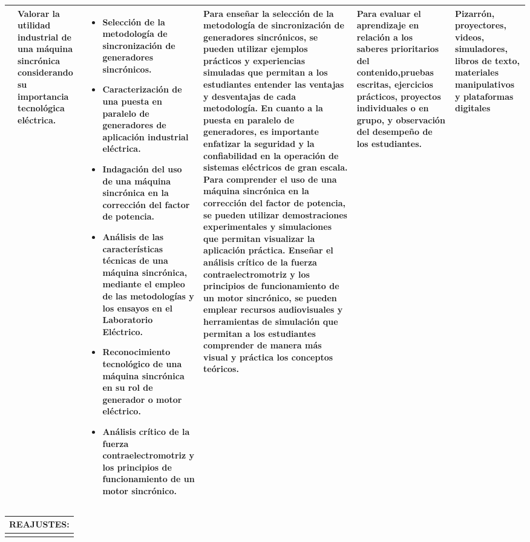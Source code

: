 \documentclass[a4paper,12pt]{article}
\newcommand{\evaluacion}{Para evaluar el aprendizaje en relación a los saberes prioritarios del contenido,pruebas escritas, ejercicios prácticos, proyectos individuales o en
grupo, y observación del desempeño de los estudiantes.}
\newcommand{\recursos}{Pizarrón, proyectores, videos, simuladores, libros de texto, materiales manipulativos y plataformas digitales}
\begin{document}
\begin{longtable}[h!]{|p{1cm}|p{3cm}|p{8cm}|p{6cm}|p{3.5cm}|p{3cm}|}
 & Valorar la utilidad industrial
de una máquina sincrónica
considerando su
importancia tecnológica
eléctrica. & \begin{itemize}
    \item Selección de la metodología de sincronización de
generadores sincrónicos.
\item Caracterización de una puesta en paralelo de
generadores de aplicación industrial eléctrica.
\item Indagación del uso de una máquina sincrónica en la
corrección del factor de potencia.
\item Análisis de las características técnicas de una máquina
sincrónica, mediante el empleo de las metodologías y los
ensayos en el Laboratorio Eléctrico.
\item Reconocimiento tecnológico de una máquina sincrónica
en su rol de generador o motor eléctrico.
\item Análisis crítico de la fuerza contraelectromotriz y los
principios de funcionamiento de un motor sincrónico. 
\end{itemize}& Para enseñar la selección de la metodología de sincronización de generadores sincrónicos, se pueden utilizar ejemplos prácticos y experiencias simuladas que permitan a los estudiantes entender las ventajas y desventajas de cada metodología. En cuanto a la puesta en paralelo de generadores, es importante enfatizar la seguridad y la confiabilidad en la operación de sistemas eléctricos de gran escala. Para comprender el uso de una máquina sincrónica en la corrección del factor de potencia, se pueden utilizar demostraciones experimentales y simulaciones que permitan visualizar la aplicación práctica. Enseñar el análisis crítico de la fuerza contraelectromotriz y los principios de funcionamiento de un motor sincrónico, se pueden emplear recursos audiovisuales y herramientas de simulación que permitan a los estudiantes comprender de manera más visual y práctica los conceptos teóricos.& \evaluacion & \recursos \\ \hline




\end{longtable}

\begin{table}[h!]
    \begin{tabular}{| p{27cm} | } \hline
      REAJUSTES:   \\ \hline
      \vspace{7cm}\\ \hline
    \end{tabular}
\end{table}


\clearpage


%


%
\end{document}
